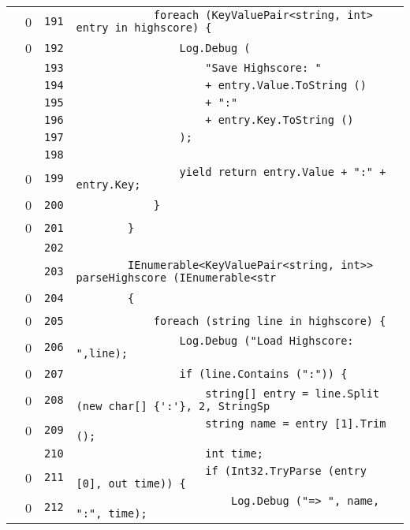 \documentclass[a4paper,10pt]{article}
\begin{document}
\begin{longtable}[l]{lrrl}
\cellcolor{red} & 0 & \verb~191~ & \verb~            foreach (KeyValuePair<string, int> entry in highscore) {~\\
\cellcolor{red} & 0 & \verb~192~ & \verb~                Log.Debug (~\\
\cellcolor{gray} &  & \verb~193~ & \verb~                    "Save Highscore: "~\\
\cellcolor{gray} &  & \verb~194~ & \verb~                    + entry.Value.ToString ()~\\
\cellcolor{gray} &  & \verb~195~ & \verb~                    + ":"~\\
\cellcolor{gray} &  & \verb~196~ & \verb~                    + entry.Key.ToString ()~\\
\cellcolor{gray} &  & \verb~197~ & \verb~                );~\\
\cellcolor{gray} &  & \verb~198~ & \verb~~\\
\cellcolor{red} & 0 & \verb~199~ & \verb~                yield return entry.Value + ":" + entry.Key;~\\
\cellcolor{red} & 0 & \verb~200~ & \verb~            }~\\
\cellcolor{red} & 0 & \verb~201~ & \verb~        }~\\
\cellcolor{gray} &  & \verb~202~ & \verb~~\\
\cellcolor{gray} &  & \verb~203~ & \verb~        IEnumerable<KeyValuePair<string, int>> parseHighscore (IEnumerable<str~\\
\cellcolor{red} & 0 & \verb~204~ & \verb~        {~\\
\cellcolor{red} & 0 & \verb~205~ & \verb~            foreach (string line in highscore) {~\\
\cellcolor{red} & 0 & \verb~206~ & \verb~                Log.Debug ("Load Highscore: ",line);~\\
\cellcolor{red} & 0 & \verb~207~ & \verb~                if (line.Contains (":")) {~\\
\cellcolor{red} & 0 & \verb~208~ & \verb~                    string[] entry = line.Split (new char[] {':'}, 2, StringSp~\\
\cellcolor{red} & 0 & \verb~209~ & \verb~                    string name = entry [1].Trim ();~\\
\cellcolor{gray} &  & \verb~210~ & \verb~                    int time;~\\
\cellcolor{red} & 0 & \verb~211~ & \verb~                    if (Int32.TryParse (entry [0], out time)) {~\\
\cellcolor{red} & 0 & \verb~212~ & \verb~                        Log.Debug ("=> ", name, ":", time);~\\

\end{longtable}
\end{document}
